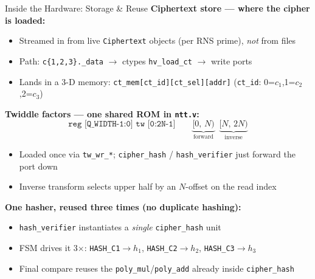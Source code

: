 \documentclass[aspectratio=169, 11pt]{beamer}
\begin{document}
\begin{frame}{Inside the Hardware: Storage \& Reuse}
\textbf{Ciphertext store --- where the cipher is loaded:}
\begin{itemize}
    \item Streamed in from live \texttt{Ciphertext} objects (per RNS prime), \emph{not} from files
    \item Path: \texttt{c\{1,2,3\}.\_data} $\to$ ctypes \texttt{hv\_load\_ct} $\to$ write ports
    \item Lands in a 3-D memory: \quad
          \texttt{ct\_mem[ct\_id][ct\_sel][addr]} \quad (\texttt{ct\_id}: 0=$c_1$,1=$c_2$,2=$c_3$)
\end{itemize}

\vspace{0.4em}
\textbf{Twiddle factors --- one shared ROM in \texttt{ntt.v}:}
\[
    \texttt{reg [Q\_WIDTH-1:0] tw [0:2N-1]} \qquad
    \underbrace{[0,\,N)}_{\text{forward}} \;\;
    \underbrace{[N,\,2N)}_{\text{inverse}}
\]
\begin{itemize}
    \item Loaded once via \texttt{tw\_wr\_*}; \texttt{cipher\_hash} / \texttt{hash\_verifier} just forward the port down
    \item Inverse transform selects upper half by an $N$-offset on the read index
\end{itemize}

\vspace{0.4em}
\textbf{One hasher, reused three times (no duplicate hashing):}
\begin{itemize}
    \item \texttt{hash\_verifier} instantiates a \emph{single} \texttt{cipher\_hash} unit
    \item FSM drives it 3$\times$: \texttt{HASH\_C1}$\to h_1$, \texttt{HASH\_C2}$\to h_2$, \texttt{HASH\_C3}$\to h_3$
    \item Final compare reuses the \texttt{poly\_mul}/\texttt{poly\_add} already inside \texttt{cipher\_hash}
\end{itemize}
\end{frame}
\end{document}
